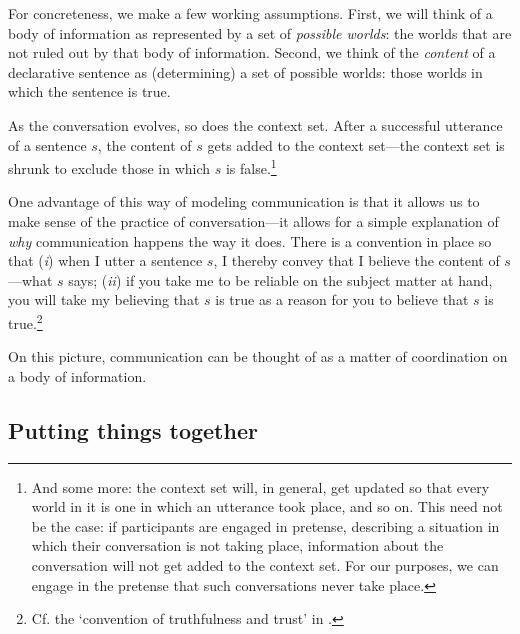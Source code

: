 \documentclass[11pt,article,oneside]{memoir}
\begin{document}
For concreteness, we make a few working assumptions. First, we will think of a body of information as represented by a set of \emph{possible worlds}: the worlds that are not ruled out by that body of information. Second, we think of the \emph{content} of a declarative sentence as (determining) a set of possible worlds: those worlds in which the sentence is true. 

As the conversation evolves, so does the context set. After a successful utterance of a sentence $s$, the content of $s$ gets added to the context set---the context set is shrunk to exclude those in which $s$ is false.\footnote{And some more: the context set will, in general, get updated so that every world in it is one in which an utterance took place, and so on. This need not be the case: if participants are engaged in pretense, describing a situation in which their conversation is not taking place, information about the conversation will not get added to the context set. For our purposes, we can engage in the pretense that such conversations never take place.} 

One advantage of this way of modeling communication is that it allows us to make sense of the practice of conversation---it allows for a simple explanation of \emph{why} communication happens the way it does. There is a convention in place so that (\emph{i}) when I utter a sentence $s$, I thereby convey that I believe the content of $s$---what $s$ says; (\emph{ii}) if you take me to be reliable on the subject matter at hand, you will take my believing that $s$ is true as a reason for you to believe that $s$ is true.\footnote{Cf. the `convention of truthfulness and trust' in \citealt{lewis1975}.}

On this picture, communication can be thought of as a matter of coordination on a body of information.  

\subsection{Putting things together}

\printbibliography
\end{document}
